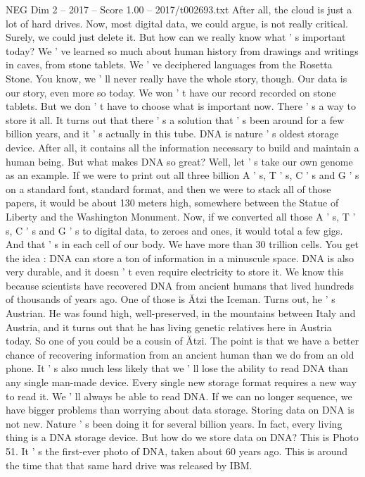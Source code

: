 \begin{textsample}{NEG Dim 2 – 2017 – Score 1.00 – 2017/t002693.txt}
After all, the cloud is just a lot of hard drives.
Now, most digital data, we could argue, is not really critical.
Surely, we could just delete it.
But how can we really know what ' s important today?
We ' ve learned so much about human history from drawings and writings in caves, from stone tablets.
We ' ve deciphered languages from the Rosetta Stone.
You know, we ' ll never really have the whole story, though.
Our data is our story, even more so today.
We won ' t have our record recorded on stone tablets.
But we don ' t have to choose what is important now.
There ' s a way to store it all.
It turns out that there ' s a solution that ' s been around for a few billion years, and it ' s actually in this tube.
DNA is nature ' s oldest storage device.
After all, it contains all the information necessary to build and maintain a human being.
But what makes DNA so great?
Well, let ' s take our own genome as an example.
If we were to print out all three billion A ' s, T ' s, C ' s and G ' s on a standard font, standard format, and then we were to stack all of those papers, it would be about 130 meters high, somewhere between the Statue of Liberty and the Washington Monument.
Now, if we converted all those A ' s, T ' s, C ' s and G ' s to digital data, to zeroes and ones, it would total a few gigs.
And that ' s in each cell of our body.
We have more than 30 trillion cells.
You get the idea : DNA can store a ton of information in a minuscule space.
DNA is also very durable, and it doesn ' t even require electricity to store it.
We know this because scientists have recovered DNA from ancient humans that lived hundreds of thousands of years ago.
One of those is Ătzi the Iceman.
Turns out, he ' s Austrian.
He was found high, well-preserved, in the mountains between Italy and Austria, and it turns out that he has living genetic relatives here in Austria today.
So one of you could be a cousin of Ătzi.
The point is that we have a better chance of recovering information from an ancient human than we do from an old phone.
It ' s also much less likely that we ' ll lose the ability to read DNA than any single man-made device.
Every single new storage format requires a new way to read it.
We ' ll always be able to read DNA.
If we can no longer sequence, we have bigger problems than worrying about data storage.
Storing data on DNA is not new.
Nature ' s been doing it for several billion years.
In fact, every living thing is a DNA storage device.
But how do we store data on DNA?
This is Photo 51.
It ' s the first-ever photo of DNA, taken about 60 years ago.
This is around the time that that same hard drive was released by IBM.

\end{textsample}
